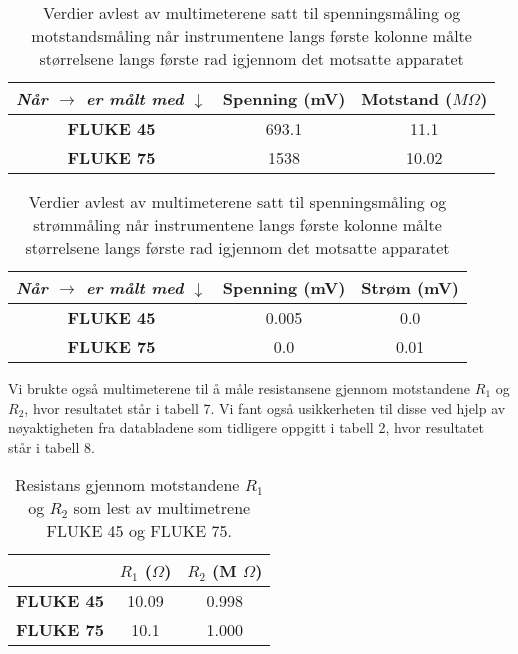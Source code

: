 \documentclass[norsk,a4paper,12pt]{article}
\begin{document}
\begin{table}
  \begin{center}
  \caption{Verdier avlest av multimeterene satt til spenningsmåling og motstandsmåling når instrumentene langs første kolonne målte størrelsene langs første rad igjennom det motsatte apparatet}
  \begin{tabular}{|c|c|c|} \hline
  \textit{Når $\rightarrow$ er målt med $\downarrow$} & \textbf{Spenning (mV)} & \textbf{Motstand ($M \Omega$)} \\ \hline
  \textbf{FLUKE 45} & 693.1  & 11.1 \\ \hline
  \textbf{FLUKE 75} & 1538 & 10.02 \\ \hline
  \end{tabular}
  \end{center}
  \label{tab:spenningmotmotstand}
\end{table}


\begin{table}
  \begin{center}
  \caption{Verdier avlest av multimeterene satt til spenningsmåling og strømmåling når instrumentene langs første kolonne målte størrelsene langs første rad igjennom det motsatte apparatet}
  \begin{tabular}{|c|c|c|} \hline
  \textit{Når $\rightarrow$ er målt med $\downarrow$} & \textbf{Spenning (mV)} & \textbf{Strøm (mV)} \\ \hline
  \textbf{FLUKE 45} & 0.005  & 0.0 \\ \hline
  \textbf{FLUKE 75} & 0.0 & 0.01 \\ \hline
  \end{tabular}
  \end{center}
  \label{tab:spenningmotstrøm}
\end{table}

Vi brukte også multimeterene til å måle resistansene gjennom motstandene $R_1$ og  $R_2$, hvor resultatet står i tabell 7. Vi fant også usikkerheten til disse ved hjelp av nøyaktigheten fra databladene som tidligere oppgitt i tabell 2, hvor resultatet står i tabell 8.



\begin{table}
  \begin{center}
  \caption{Resistans gjennom motstandene $R_1$ og $R_2$ som lest av multimetrene FLUKE 45 og FLUKE 75.}
  \begin{tabular}{|c|c|c|} \hline
  \textit{} & \textbf{$R_1$ ($\Omega$)} & \textbf{$R_2$ (M $\Omega$)} \\ \hline
  \textbf{FLUKE 45} & 10.09  & 0.998 \\ \hline
  \textbf{FLUKE 75} & 10.1 & 1.000 \\ \hline
  \end{tabular}
  \end{center}
  \label{tab:resistans}
\end{table}
\end{document}
